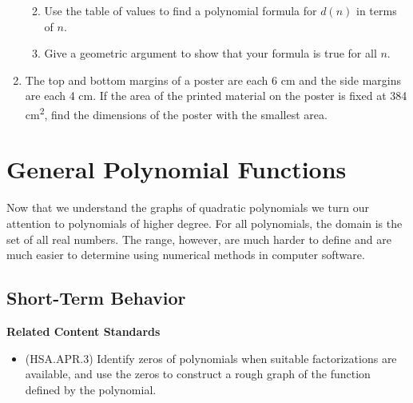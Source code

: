\documentclass[
]{book}
\providecommand{\tightlist}{%
  \setlength{\itemsep}{0pt}\setlength{\parskip}{0pt}}
\newenvironment{standards}{}{}
\let\stdsection\section
\renewcommand\section{\newpage\stdsection}
\theoremstyle{definition}
\theoremstyle{definition}
\theoremstyle{definition}
\theoremstyle{definition}
\theoremstyle{remark}
\begin{document}
\begin{enumerate}
  \begin{enumerate}
  \def\labelenumii{\alph{enumii}.}
  \tightlist
  \item
    Use the table of values to find a polynomial formula for \(d(n)\) in terms of \(n\).
  \item
    Give a geometric argument to show that your formula is true for all \(n\).
  \end{enumerate}
\item
  The top and bottom margins of a poster are each 6 cm and the side margins are each 4 cm. If the area of the printed material on the poster is fixed at 384 cm\textsuperscript{2}, find the dimensions of the poster with the smallest area.
\end{enumerate}

\hypertarget{general-polynomial-functions}{%
\section{General Polynomial Functions}\label{general-polynomial-functions}}

Now that we understand the graphs of quadratic polynomials we turn our attention to polynomials of higher degree. For all polynomials, the domain is the set of all real numbers. The range, however, are much harder to define and are much easier to determine using numerical methods in computer software.

\hypertarget{short-term-behavior}{%
\subsection{Short-Term Behavior}\label{short-term-behavior}}

\begin{standards}

\begin{center}
\textbf{Related Content Standards}

\end{center}

\begin{itemize}
\tightlist
\item
  (HSA.APR.3) Identify zeros of polynomials when suitable factorizations are available, and use the zeros to construct a rough graph of the function defined by the polynomial.\\
\end{itemize}

\end{standards}
\end{document}
